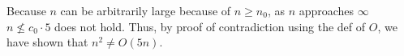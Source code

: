 \documentclass[a4paper]{report}
\begin{document}
\begin{enumerate}
    Because $n$ can be arbitrarily large because of $n \geq n_{0}$, as $n$ approaches $\infty$ $n \nleq c_{0} \cdot 5$ does not hold. 
  Thus, by proof of contradiction using the def of $O$, we have shown that $n^2 \neq O(5n)$.

    \par
    \bigskip
    \setcounter{equation}{0}

  \end{enumerate}

  
  
\end{document}
